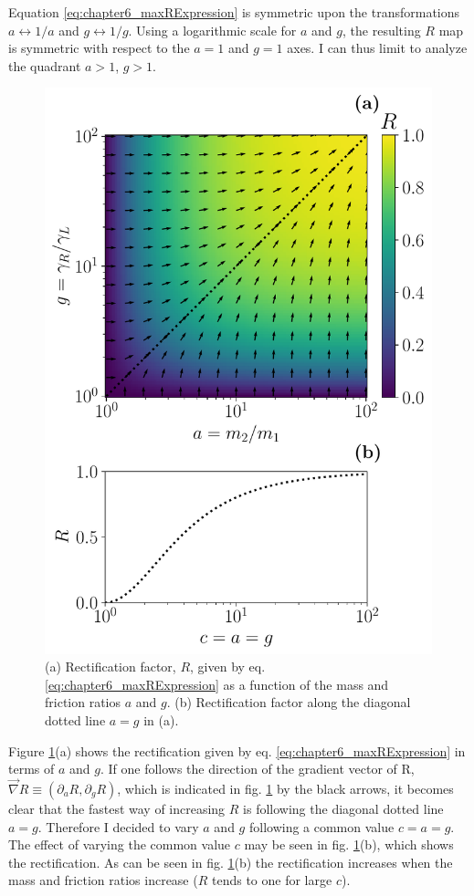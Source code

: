Equation \eqref{eq:chapter6_maxRExpression} is symmetric upon the transformations $a \leftrightarrow 1/a$ and $g \leftrightarrow 1/g$. Using a logarithmic scale for $a$ and $g$, the resulting $R$ map is symmetric with respect to the $a=1$ and $g=1$ axes. I can thus limit to analyze the quadrant $a > 1$, $g > 1$.


\begin{figure}
  \center
  \includegraphics[width=0.85\linewidth]{Figures/MaximalR.pdf}
  \caption{(a) Rectification factor, $R$, given by eq. \eqref{eq:chapter6_maxRExpression} as a function of the mass and friction ratios $a$ and $g$. (b) Rectification factor along the diagonal dotted line $a=g$ in (a).}
  \label{fig:maximalR}
\end{figure}

Figure \ref{fig:maximalR}(a) shows the rectification given by eq. \eqref{eq:chapter6_maxRExpression} in terms of $a$ and $g$. If one follows the direction of the gradient vector of R, $\overrightarrow{\nabla}R\equiv\left( \partial_a R, \partial_g R \right)$, which is indicated in fig. \ref{fig:maximalR} by the black arrows, it becomes clear that the fastest way of increasing $R$ is following the diagonal dotted line $a=g$. Therefore I decided to vary $a$ and $g$ following a common value $c=a = g$. The effect of varying  the common value $c$ may be seen in fig. \ref{fig:maximalR}(b), which  shows the rectification. As can be seen in fig. \ref{fig:maximalR}(b) the rectification increases when the mass and friction ratios increase ($R$ tends to one for large $c$).
%
%
